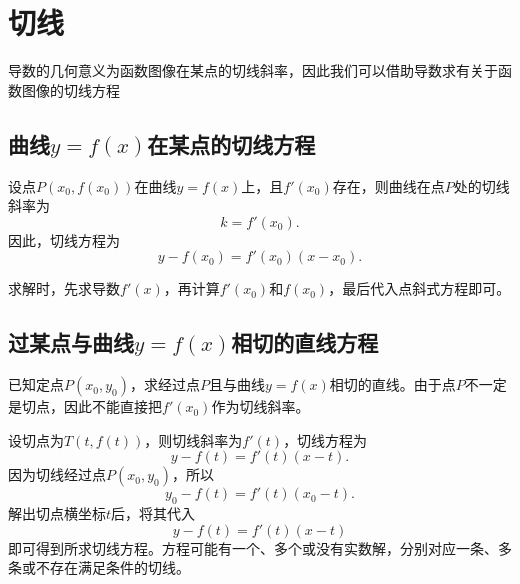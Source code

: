 

\section{切线}
导数的几何意义为函数图像在某点的切线斜率，因此我们可以借助导数求有关于函数图像的切线方程
\subsection{曲线$y=f(x)$在某点的切线方程}

设点$P(x_0,f(x_0))$在曲线$y=f(x)$上，且$f'(x_0)$存在，则曲线在点$P$处的切线斜率为
\[
k=f'(x_0).
\]
因此，切线方程为
\[
y-f(x_0)=f'(x_0)(x-x_0).
\]

求解时，先求导数$f'(x)$，再计算$f'(x_0)$和$f(x_0)$，最后代入点斜式方程即可。

\subsection{过某点与曲线$y=f(x)$相切的直线方程}

已知定点$P(x_0,y_0)$，求经过点$P$且与曲线$y=f(x)$相切的直线。由于点$P$不一定是切点，因此不能直接把$f'(x_0)$作为切线斜率。

设切点为$T(t,f(t))$，则切线斜率为$f'(t)$，切线方程为
\[
y-f(t)=f'(t)(x-t).
\]
因为切线经过点$P(x_0,y_0)$，所以
\[
y_0-f(t)=f'(t)(x_0-t).
\]
解出切点横坐标$t$后，将其代入
\[
y-f(t)=f'(t)(x-t)
\]
即可得到所求切线方程。方程可能有一个、多个或没有实数解，分别对应一条、多条或不存在满足条件的切线。




